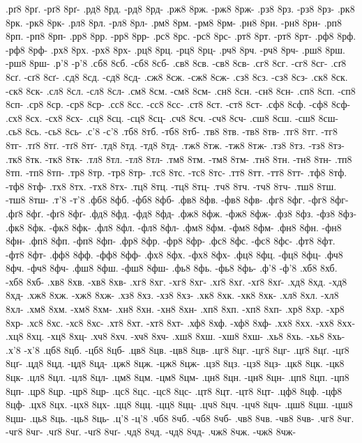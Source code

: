 {.рґ8 8рґ. -рґ8 8рґ-
.рд8 8рд. -рд8 8рд-
.рж8 8рж. -рж8 8рж-
.рз8 8рз. -рз8 8рз-
.рк8 8рк. -рк8 8рк-
.рл8 8рл. -рл8 8рл-
.рм8 8рм. -рм8 8рм-
.рн8 8рн. -рн8 8рн-
.рп8 8рп. -рп8 8рп-
.рр8 8рр. -рр8 8рр-
.рс8 8рс. -рс8 8рс-
.рт8 8рт. -рт8 8рт-
.рф8 8рф. -рф8 8рф-
.рх8 8рх. -рх8 8рх-
.рц8 8рц. -рц8 8рц-
.рч8 8рч. -рч8 8рч-
.рш8 8рш. -рш8 8рш-
.р'8 -р'8
.сб8 8сб. -сб8 8сб-
.св8 8св. -св8 8св-
.сг8 8сг. -сг8 8сг-
.сґ8 8сґ. -сґ8 8сґ-
.сд8 8сд. -сд8 8сд-
.сж8 8сж. -сж8 8сж-
.сз8 8сз. -сз8 8сз-
.ск8 8ск. -ск8 8ск-
.сл8 8сл. -сл8 8сл-
.см8 8см. -см8 8см-
.сн8 8сн. -сн8 8сн-
.сп8 8сп. -сп8 8сп-
.ср8 8ср. -ср8 8ср-
.сс8 8сс. -сс8 8сс-
.ст8 8ст. -ст8 8ст-
.сф8 8сф. -сф8 8сф-
.сх8 8сх. -сх8 8сх-
.сц8 8сц. -сц8 8сц-
.сч8 8сч. -сч8 8сч-
.сш8 8сш. -сш8 8сш-
.сь8 8сь. -сь8 8сь-
.с'8 -с'8
.тб8 8тб. -тб8 8тб-
.тв8 8тв. -тв8 8тв-
.тг8 8тг. -тг8 8тг-
.тґ8 8тґ. -тґ8 8тґ-
.тд8 8тд. -тд8 8тд-
.тж8 8тж. -тж8 8тж-
.тз8 8тз. -тз8 8тз-
.тк8 8тк. -тк8 8тк-
.тл8 8тл. -тл8 8тл-
.тм8 8тм. -тм8 8тм-
.тн8 8тн. -тн8 8тн-
.тп8 8тп. -тп8 8тп-
.тр8 8тр. -тр8 8тр-
.тс8 8тс. -тс8 8тс-
.тт8 8тт. -тт8 8тт-
.тф8 8тф. -тф8 8тф-
.тх8 8тх. -тх8 8тх-
.тц8 8тц. -тц8 8тц-
.тч8 8тч. -тч8 8тч-
.тш8 8тш. -тш8 8тш-
.т'8 -т'8
.фб8 8фб. -фб8 8фб-
.фв8 8фв. -фв8 8фв-
.фг8 8фг. -фг8 8фг-
.фґ8 8фґ. -фґ8 8фґ-
.фд8 8фд. -фд8 8фд-
.фж8 8фж. -фж8 8фж-
.фз8 8фз. -фз8 8фз-
.фк8 8фк. -фк8 8фк-
.фл8 8фл. -фл8 8фл-
.фм8 8фм. -фм8 8фм-
.фн8 8фн. -фн8 8фн-
.фп8 8фп. -фп8 8фп-
.фр8 8фр. -фр8 8фр-
.фс8 8фс. -фс8 8фс-
.фт8 8фт. -фт8 8фт-
.фф8 8фф. -фф8 8фф-
.фх8 8фх. -фх8 8фх-
.фц8 8фц. -фц8 8фц-
.фч8 8фч. -фч8 8фч-
.фш8 8фш. -фш8 8фш-
.фь8 8фь. -фь8 8фь-
.ф'8 -ф'8
.хб8 8хб. -хб8 8хб-
.хв8 8хв. -хв8 8хв-
.хг8 8хг. -хг8 8хг-
.хґ8 8хґ. -хґ8 8хґ-
.хд8 8хд. -хд8 8хд-
.хж8 8хж. -хж8 8хж-
.хз8 8хз. -хз8 8хз-
.хк8 8хк. -хк8 8хк-
.хл8 8хл. -хл8 8хл-
.хм8 8хм. -хм8 8хм-
.хн8 8хн. -хн8 8хн-
.хп8 8хп. -хп8 8хп-
.хр8 8хр. -хр8 8хр-
.хс8 8хс. -хс8 8хс-
.хт8 8хт. -хт8 8хт-
.хф8 8хф. -хф8 8хф-
.хх8 8хх. -хх8 8хх-
.хц8 8хц. -хц8 8хц-
.хч8 8хч. -хч8 8хч-
.хш8 8хш. -хш8 8хш-
.хь8 8хь. -хь8 8хь-
.х'8 -х'8
.цб8 8цб. -цб8 8цб-
.цв8 8цв. -цв8 8цв-
.цг8 8цг. -цг8 8цг-
.цґ8 8цґ. -цґ8 8цґ-
.цд8 8цд. -цд8 8цд-
.цж8 8цж. -цж8 8цж-
.цз8 8цз. -цз8 8цз-
.цк8 8цк. -цк8 8цк-
.цл8 8цл. -цл8 8цл-
.цм8 8цм. -цм8 8цм-
.цн8 8цн. -цн8 8цн-
.цп8 8цп. -цп8 8цп-
.цр8 8цр. -цр8 8цр-
.цс8 8цс. -цс8 8цс-
.цт8 8цт. -цт8 8цт-
.цф8 8цф. -цф8 8цф-
.цх8 8цх. -цх8 8цх-
.цц8 8цц. -цц8 8цц-
.цч8 8цч. -цч8 8цч-
.цш8 8цш. -цш8 8цш-
.ць8 8ць. -ць8 8ць-
.ц'8 -ц'8
.чб8 8чб. -чб8 8чб-
.чв8 8чв. -чв8 8чв-
.чг8 8чг. -чг8 8чг-
.чґ8 8чґ. -чґ8 8чґ-
.чд8 8чд. -чд8 8чд-
.чж8 8чж. -чж8 8чж-
}
